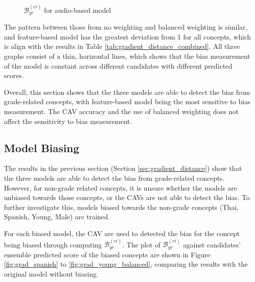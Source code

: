 \begin{figure}[H]
    \centering
    \caption{$\mathcal{B}^{(ci)}_{gr}$ for audio-based model}
    \label{fig:gradient_distance_audio}
\end{figure}

The pattern between those from no weighting and balanced weighting is similar, and feature-based model has the greatest deviation from 1 for all concepts, which is align with the results in Table \ref{tab:gradient_distance_combined}. All three graphs consist of a thin, horizontal lines, which shows that the bias measurement of the model is constant across different candidates with different predicted scores.

Overall, this section shows that the three models are able to detect the bias from grade-related concepts, with feature-based model being the most sensitive to bias measurement. The CAV accuracy and the use of balanced weighting does not affect the sensitivity to bias measurement.

\subsection{Model Biasing} \label{sec:model_biasing}
The results in the previous section (Section \ref{sec:gradient_distance}) show that the three models are able to detect the bias from grade-related concepts. However, for non-grade related concepts, it is unsure whether the models are unbiased towards those concepts, or the CAVs are not able to detect the bias. To further investigate this, models biased towards the non-grade concepts (Thai, Spanish, Young, Male) are trained.

For each biased model, the CAV are used to detected the bias for the concept being biased through computing $\mathcal{B}^{(ci)}_{gr}$. The plot of $\mathcal{B}^{(ci)}_{gr}$ against candidates’ ensemble predicted score of the biased concepts are shown in Figure \ref{fig:grad_spanish} to \ref{fig:grad_young_balanced}, comparing the results with the original model without biasing.

